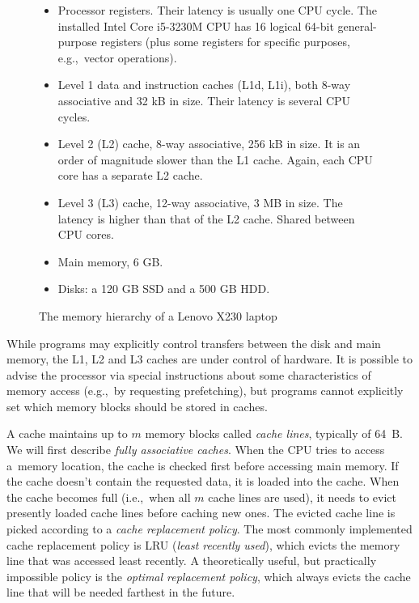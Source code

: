 \begin{figure}
\begin{itemize}
\item Processor registers. Their latency is usually one CPU cycle.
	The installed Intel Core i5-3230M CPU has 16 logical 64-bit
	general-purpose registers (plus some registers for specific purposes,
	e.g.,\ vector operations).
\item Level 1 data and instruction caches (L1d, L1i), both 8-way associative
	and 32 kB in size. Their latency is several CPU cycles.
\item Level 2 (L2) cache, 8-way associative, 256 kB in size.
	It is an order of magnitude slower than the L1 cache. Again, each
	CPU core has a separate L2 cache.
\item Level 3 (L3) cache, 12-way associative, 3 MB in size.
	The latency is higher than that of the L2 cache. Shared between CPU
	cores.
\item Main memory, 6 GB.
\item Disks: a 120 GB SSD and a 500 GB HDD.
\end{itemize}
\caption{The memory hierarchy of a Lenovo X230 laptop}
\end{figure}

While programs may explicitly control transfers between the disk and main
memory, the L1, L2 and L3 caches are under control of hardware.
It is possible to advise the processor via special instructions about some
characteristics of memory access (e.g.,\ by requesting prefetching), but
programs cannot explicitly set which memory blocks should be stored in caches.

A cache maintains up to $m$ memory blocks called \textit{cache lines},
typically of 64~B.
We will first describe \emph{fully associative caches}.
When the CPU tries to access a~memory location, the cache is checked first
before accessing main memory. If the cache doesn't contain the requested data,
it is loaded into the cache. When the cache becomes full (i.e.,\ when all $m$
cache lines are used), it needs to evict presently loaded cache lines before
caching new ones. The evicted cache line is picked according to a \emph{cache
replacement policy}. The most commonly implemented cache replacement policy is
LRU (\emph{least recently used}), which evicts the memory line that was
accessed least recently.
A theoretically useful, but practically impossible policy is the \emph{optimal
replacement policy}, which always evicts the cache line that will be needed
farthest in the future.


